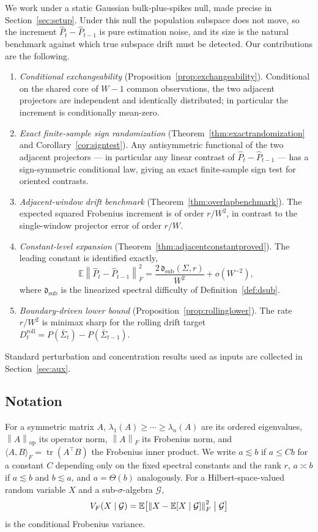 \documentclass[11pt]{article}
\theoremstyle{tightplain}
\theoremstyle{tightdef}
\DeclareMathOperator{\tr}{tr}
\DeclareMathOperator{\op}{op}
\newcommand{\E}{\mathbb E}
\newcommand{\norm}[1]{\left\lVert #1 \right\rVert}
\begin{document}
We work under a static Gaussian bulk-plus-spikes null, made precise in
Section~\ref{sec:setup}. Under this null the population subspace does not move,
so the increment $\widehat P_t-\widehat P_{t-1}$ is pure estimation noise, and
its size is the natural benchmark against which true subspace drift must be
detected. Our contributions are the following.
\begin{enumerate}
\item \emph{Conditional exchangeability}
(Proposition~\ref{prop:exchangeability}). Conditional on the shared core of
$W-1$ common observations, the two adjacent projectors are independent and
identically distributed; in particular the increment is conditionally
mean-zero.
\item \emph{Exact finite-sample sign randomization}
(Theorem~\ref{thm:exactrandomization} and Corollary~\ref{cor:signtest}). Any
antisymmetric functional of the two adjacent projectors --- in particular any
linear contrast of $\widehat P_t-\widehat P_{t-1}$ --- has a sign-symmetric
conditional law, giving an exact finite-sample sign test for oriented
contrasts.
\item \emph{Adjacent-window drift benchmark}
(Theorem~\ref{thm:overlapbenchmark}). The expected squared Frobenius increment
is of order $r/W^2$, in contrast to the single-window projector error of order
$r/W$.
\item \emph{Constant-level expansion}
(Theorem~\ref{thm:adjacentconstantproved}). The leading constant is identified
exactly,
\[
\E\norm{\widehat P_t-\widehat P_{t-1}}_F^2
= \frac{2\,\mathfrak d_{\mathrm{sub}}(\Sigma,r)}{W^2}+o(W^{-2}),
\]
where $\mathfrak d_{\mathrm{sub}}$ is the linearized spectral difficulty of
Definition~\ref{def:dsub}.
\item \emph{Boundary-driven lower bound}
(Proposition~\ref{prop:rollinglower}). The rate $r/W^2$ is minimax sharp for
the rolling drift target $D_t^{\mathrm{roll}}=P(\bar\Sigma_t)-P(\bar\Sigma_{t-1})$.
\end{enumerate}
Standard perturbation and concentration results used as inputs are collected in
Section~\ref{sec:aux}.

\subsection{Notation}

For a symmetric matrix $A$, $\lambda_1(A)\ge\cdots\ge\lambda_n(A)$ are its
ordered eigenvalues, $\norm{A}_{\op}$ its operator norm, $\norm{A}_F$ its
Frobenius norm, and $\langle A,B\rangle_F=\tr(A^\top B)$ the Frobenius inner
product. We write $a\lesssim b$ if $a\le Cb$ for a constant $C$ depending only
on the fixed spectral constants and the rank $r$, $a\asymp b$ if $a\lesssim b$
and $b\lesssim a$, and $a=\Theta(b)$ analogously. For a Hilbert-space-valued
random variable $X$ and a sub-$\sigma$-algebra $\mathcal G$,
\[
V_F(X\mid\mathcal G)
=
\E\bigl[\norm{X-\E[X\mid\mathcal G]}_F^2\bigm|\mathcal G\bigr]
\]
is the conditional Frobenius variance.
\end{document}
